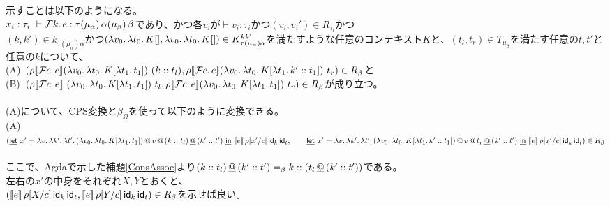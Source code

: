 \documentclass[japanese,draft]{jssst_ppl} %
\begin{document}
示すことは以下のようになる。\\
$x_i:\tau_i\ \vdash \Control{k}{e}:\tau \TrailType{\alpha} \TrailType{\beta}$であり、かつ各$v_i$が$\vdash v_i:\tau_i$かつ$(v_i,v_i') \in R_{\tau_i}$かつ\\
$(k,k')\in k_{\tau(\mu_{\alpha})\alpha}$かつ$(\Lam{v_0}{\Lam{t_0}{K[]}}, \Lam{v_0}{\Lam{t_0}{K[]}})\in  K^{kk'}_{\tau(\mu_{\alpha})\alpha}$を満たすような任意のコンテキスト$K$と、$(t_l, t_r) \in T_{\mu_{\beta}}$を満たす任意の$t, t'$と任意の$k$について、\\
  (A)\ $(\rho \CPSTh{\Control{c}{e}} \LamP{v_0}{\Lam{t_0}{K[\Lam{t_1}{t_1}]}}\ (\Cons{k}{t_l}), \rho \CPSTh{\Control{c}{e}} \LamP{v_0}{\Lam{t_0}{K[\Lam{t_1}{\Cons{k'}{t_1}}]}}\ t_r)\in R_{\beta}$と\\
(B)\ $(\rho \CPSTh{\Control{c}{e}}\ \LamP{v_0}{\Lam{t_0}{K[\Lam{t_1}{t_1}]}}\ t_l, \rho \CPSTh{\Control{c}{e}} \LamP{v_0}{\Lam{t_0}{K[\Lam{t_1}{t_1}]}}\ t_r)\in R_{\beta}$が成り立つ。\\
\\
(A)について、CPS変換と$\beta_{\Omega}$を使って以下のように変換できる。\\
(A)\ $(\DLet{x'}
      {\Lam{v}{\Lam{k'}{\Lam{t'}
        {\App{\App{\LamP{v_0}{\Lam{t_0}{K[\Lam{t_1}{t_1}]}}}{v}}{\DAppend{\ConsP{k}{t_l}}{\ConsP{k'}{t'}}}}}}}
      {\CPS{e}{\rho[\Change{c}{x'}]}{\Idk}{\Idt}},\\
\qquad   \DLet{x'}
      {\Lam{v}{\Lam{k'}{\Lam{t'}
        {\App{\App{\LamP{v_0}{\Lam{t_0}{K[\Lam{t_1}{\Cons{k'}{t_1}}]}}}{v}}{\DAppend{t_r}{\ConsP{k'}{t'}}}}}}}
      {\CPS{e}{\rho[\Change{c}{x'}]}{\Idk}{\Idt}})
      \in R_{\beta}$\\
\\
ここで、Agdaで示した補題\ref{ConsAssoc}より$\DAppend{\ConsP{k}{t_l}}{\ConsP{k'}{t'}} =_{\beta} \Cons{k}{(\DAppend{t_l}{\ConsP{k'}{t'}}})$である。\\
      左右の$x'$の中身をそれぞれ$X,Y$とおくと、\\
      $(\CPS{e}{\rho[\Change{c}{X}]}{\Idk}{\Idt},\CPS{e}{\rho[\Change{c}{Y}]}{\Idk}{\Idt})\in R_{\beta}$を示せば良い。\\
\end{document}
